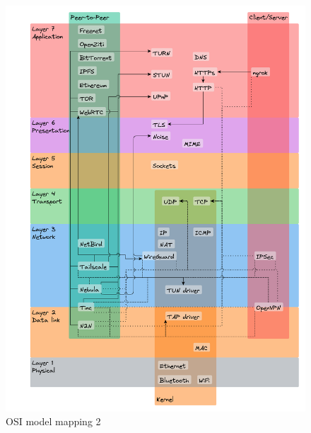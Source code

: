 \begin{figure}
\centering
\includegraphics[width=\textwidth,height=0.9\textheight]{notes/../figures/osi-map.yed.png}
\caption{OSI model mapping 2}
\end{figure}

\newpage

